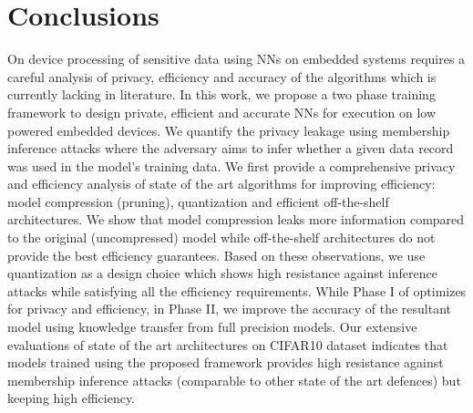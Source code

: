 \section{Conclusions}\label{conclusions}

On device processing of sensitive data using NNs on embedded systems requires a careful analysis of privacy, efficiency and accuracy of the algorithms which is currently lacking in literature.
In this work, we propose a two phase \method\hspace{0.02in} training framework to design private, efficient and accurate NNs for execution on low powered embedded devices.
We quantify the privacy leakage using membership inference attacks where the adversary aims to infer whether a given data record was used in the model's training data.
We first provide a comprehensive privacy and efficiency analysis of state of the art algorithms for improving efficiency: model compression (pruning), quantization and efficient off-the-shelf architectures.
We show that model compression leaks more information compared to the original (uncompressed) model while off-the-shelf architectures do not provide the best efficiency guarantees.
Based on these observations, we use quantization as a design choice which shows high resistance against inference attacks while satisfying all the efficiency requirements.
While Phase I of \method\hspace{0.02in} optimizes for privacy and efficiency, in Phase II, we improve the accuracy of the resultant model using knowledge transfer from full precision models.
Our extensive evaluations of state of the art architectures on CIFAR10 dataset indicates that models trained using the proposed framework provides high resistance against membership inference attacks (comparable to other state of the art defences) but keeping high efficiency.
